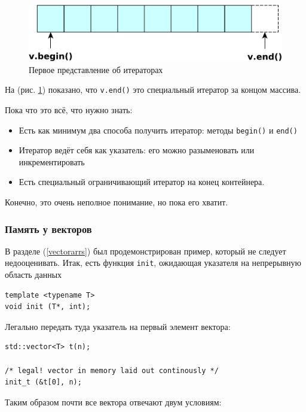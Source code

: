 \documentclass[a4paper,12pt,oneside]{article}
\begin{document}
\begin{figure}[h!]
\centering
\includegraphics[width=1.0\textwidth]{illustrations/iter-starter-crop.pdf}
\caption{Первое представление об итераторах}
\label{fig:iter_starter}
\end{figure}

На (рис. \ref{fig:iter_starter}) показано, что \lstinline!v.end()! это специальный итератор за концом массива.

Пока что это всё, что нужно знать:
\begin{itemize}
\item Есть как минимум два способа получить итератор: методы \lstinline!begin()! и \lstinline!end()!
\item Итератор ведёт себя как указатель: его можно разыменовать или инкрементировать
\item Есть специальный ограничивающий итератор на конец контейнера.
\end{itemize}

Конечно, это очень неполное понимание, но пока его хватит.

\subsubsection{Память у векторов}\label{vecmemcontrol}

В разделе (\ref{vectorarrs}) был продемонстрирован пример, который не следует недооценивать. Итак, есть функция \lstinline!init!, ожидающая указателя на непрерывную область данных

\begin{lstlisting}
template <typename T>
void init (T*, int);
\end{lstlisting}

Легально передать туда указатель на первый элемент вектора:

\begin{lstlisting}
std::vector<T> t(n);

/* legal! vector in memory laid out continously */
init_t (&t[0], n);
\end{lstlisting}

Таким образом почти все вектора отвечают двум условиям:
\end{document}
